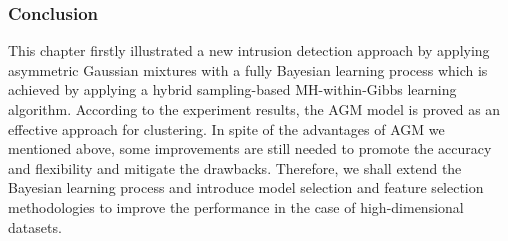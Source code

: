 \subsubsection{Conclusion}
\label{sec:2.5.4}

This chapter firstly illustrated a new intrusion detection approach by applying asymmetric Gaussian mixtures with a fully Bayesian learning process which is achieved by applying a hybrid sampling-based MH-within-Gibbs learning algorithm. According to the experiment results, the AGM model is proved as an effective approach for clustering.
In spite of the advantages of AGM we mentioned above, some improvements are still needed to promote the accuracy and flexibility and mitigate the drawbacks. Therefore, we shall extend the Bayesian learning process and introduce model selection and feature selection methodologies to improve the performance in the case of high-dimensional datasets.







